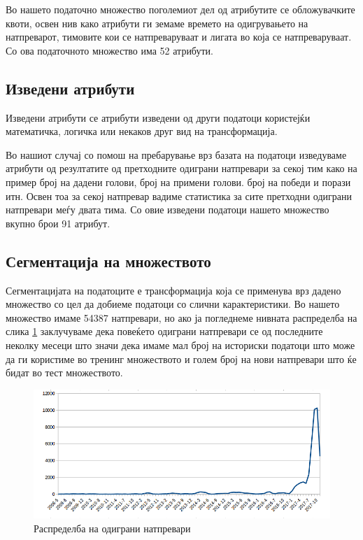Во нашето податочно множество поголемиот дел од атрибутите се обложувачките квоти, освен нив како атрибути ги земаме времето на одигрувањето на натпреварот, тимовите кои се натпреваруваат и лигата во која се натпреваруваат. Со ова податочното множество има 52 атрибути.
\subsection{Изведени атрибути}
Изведени атрибути се атрибути изведени од други податоци користејќи математичка, логичка или некаков друг вид на трансформација.

Во нашиот случај со помош на пребарување врз базата на податоци изведуваме атрибути од резултатите од претходните одиграни натпревари за секој тим како на пример број на дадени голови, број на примени голови. број на победи и порази итн. Освен тоа за секој натпревар вадиме статистика за сите претходни одиграни натпревари меѓу двата тима. Со овие изведени податоци нашето множество вкупно брои 91 атрибут. 
\subsection{Сегментација на множеството}
Сегментацијата на податоците е трансформација која се применува врз дадено множество со цел да добиеме податоци со слични карактеристики. Во нашето множество имаме 54387 натпревари, но ако ја погледнеме нивната распределба на слика \ref{fig:raspredelba} заклучуваме дека повеќето одиграни натпревари се од последните неколку месеци што значи дека имаме мал број на историски податоци што може да ги користиме во тренинг множеството и голем број на нови натпревари што ќе бидат во тест множеството. 
\begin{figure}[hbtp]
\centering
\includegraphics[scale=0.4]{images/raspredelba.png}
\caption{Распределба на одиграни натпревари}
\label{fig:raspredelba}
\end{figure}

